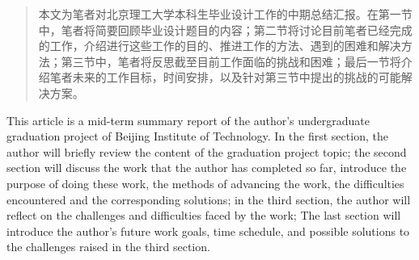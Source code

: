 %
%
%
%
%

\begin{abstract}
本文为笔者对北京理工大学本科生毕业设计工作的中期总结汇报。在第一节中，笔者将简要回顾毕业设计题目的内容；第二节将讨论目前笔者已经完成的工作，介绍进行这些工作的目的、推进工作的方法、遇到的困难和解决方法；第三节中，笔者将反思截至目前工作面临的挑战和困难；最后一节将介绍笔者未来的工作目标，时间安排，以及针对第三节中提出的挑战的可能解决方案。

\end{abstract}

\begin{abstractEn}
This article is a mid-term summary report of the author’s undergraduate graduation project of Beijing Institute of Technology. In the first section, the author will briefly review the content of the graduation project topic; the second section will discuss the work that the author has completed so far, introduce the purpose of doing these work, the methods of advancing the work, the difficulties encountered and the corresponding solutions; in the third section, the author will reflect on the challenges and difficulties faced by the work; The last section will introduce the author’s future work goals, time schedule, and possible solutions to the challenges raised in the third section.

\end{abstractEn}
